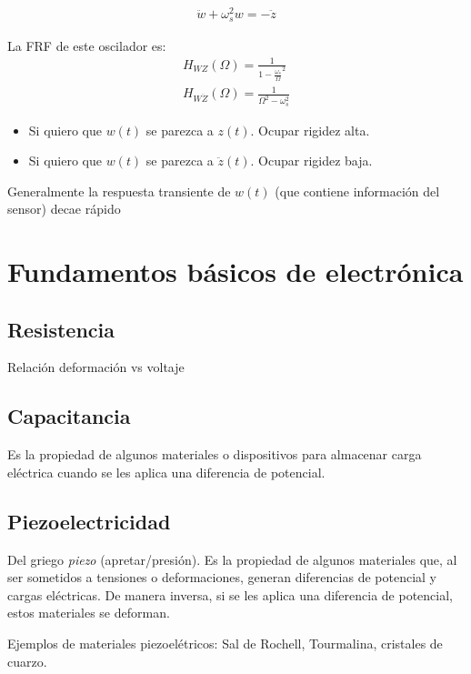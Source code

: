 \begin{align*}
    \ddot{w} + \omega_s^2 w = -\ddot{z}
\end{align*}

La FRF de este oscilador es:
\begin{align*}
    H_{WZ}(\Omega) = \frac{1}{1-\frac{\omega_s}{\Omega}^2}\\
    H_{W\ddot{Z}}(\Omega) = \frac{1}{\Omega^2 - \omega_s^2}
\end{align*}

\begin{itemize}
    \item Si quiero que $w(t)$ se parezca a $z(t)$. Ocupar rigidez alta.
    \item Si quiero que $w(t)$ se parezca a $\ddot{z}(t)$. Ocupar rigidez baja.
\end{itemize}


Generalmente la respuesta transiente de $w(t)$ (que contiene información del sensor) decae rápido

\section{Fundamentos básicos de electrónica}

\subsection{Resistencia}

Relación deformación vs voltaje

\subsection{Capacitancia}
Es la propiedad de algunos materiales o dispositivos para almacenar carga eléctrica cuando se les aplica una diferencia de potencial.

\subsection{Piezoelectricidad}
Del griego \emph{piezo} (apretar/presión). Es la propiedad de algunos materiales que, al ser sometidos a tensiones o deformaciones, generan diferencias de potencial y cargas eléctricas. De manera inversa, si se les aplica una diferencia de potencial, estos materiales se deforman.

Ejemplos de materiales piezoelétricos: Sal de Rochell, Tourmalina, cristales de cuarzo.

